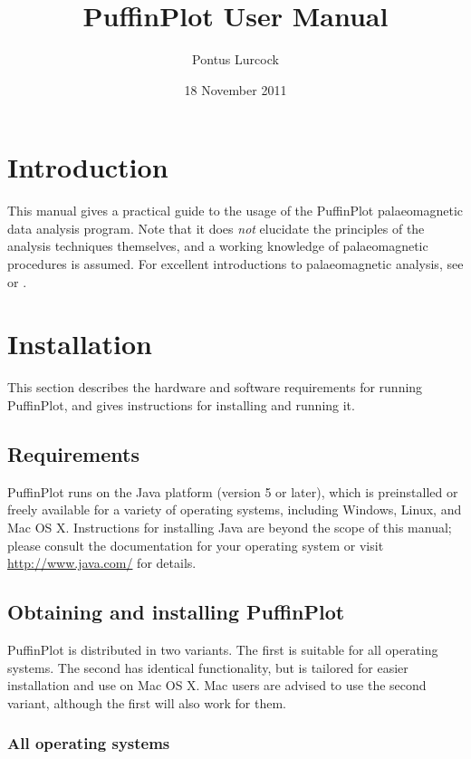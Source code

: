 \documentclass[a4paper]{article}
\title{PuffinPlot User Manual}
\author{Pontus Lurcock}
\date{18 November 2011}
\begin{document}
\maketitle

\section{Introduction}

This manual gives a practical guide to the usage of the PuffinPlot
palaeomagnetic data analysis program. Note that it does \emph{not} elucidate
the principles of the analysis techniques themselves, and a working knowledge
of palaeomagnetic procedures is assumed. For excellent introductions to
palaeomagnetic analysis, see \cite{tauxe2010paleomagnetism} or
\cite{butler1992paleomagnetism}.

\section{Installation}

This section describes the hardware and software requirements for
running PuffinPlot, and gives instructions for installing and running
it.

\subsection{Requirements}

PuffinPlot runs on the Java platform (version 5 or later), which is
preinstalled or freely available for a variety of operating systems,
including Windows, Linux, and Mac OS X. Instructions for installing Java
are beyond the scope of this manual; please consult the documentation
for your operating system or visit \url{http://www.java.com/} for
details.

\subsection{Obtaining and installing PuffinPlot}

PuffinPlot is distributed in two variants. The first is suitable for all
operating systems. The second has identical functionality, but is
tailored for easier installation and use on Mac OS X. Mac users are
advised to use the second variant, although the first will also work for
them.

\subsubsection{All operating systems}
\end{document}
